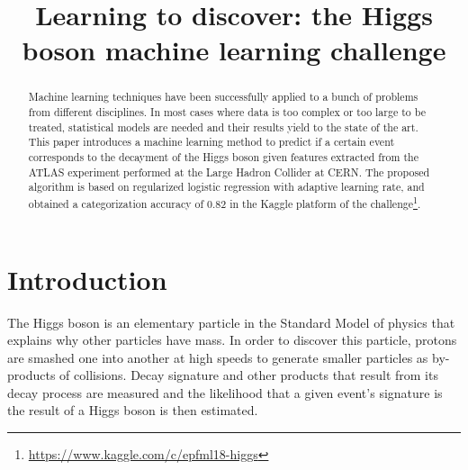 \documentclass[10pt,conference,compsocconf]{IEEEtran}
\begin{document}
\title{Learning to discover: the Higgs boson machine learning challenge}

\author{
	}

\maketitle

\begin{abstract}
  Machine learning techniques have been successfully applied to a bunch of problems from different disciplines. In most cases where data is too complex or too large to be treated, statistical models are needed and their results yield to the state of the art. This paper introduces a machine learning method to predict if a certain event corresponds to the decayment of the Higgs boson given features extracted from the ATLAS experiment performed at the Large Hadron Collider at CERN. The proposed algorithm is based on regularized logistic regression with adaptive learning rate, and obtained a categorization accuracy of 0.82 in the Kaggle platform of the challenge\footnote{\url{https://www.kaggle.com/c/epfml18-higgs}}.
\end{abstract}


\section{Introduction}

The Higgs boson is an elementary particle in the Standard Model of physics that explains why other particles have mass. In order to discover this particle, protons are smashed one into another at high speeds to generate smaller particles as by-products of collisions. Decay signature and other products that result from its decay process are measured and the likelihood that a given event's signature is the result of a Higgs boson is then estimated.
\end{document}
